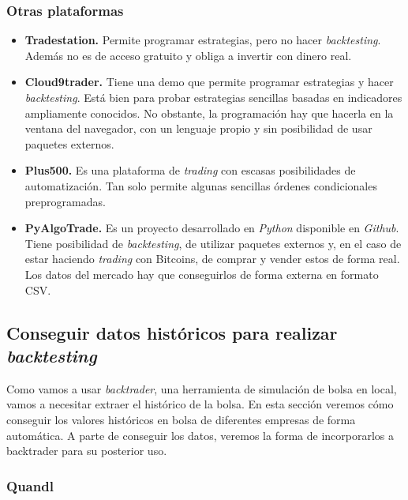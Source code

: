 		
		\subsubsection{Otras plataformas}

		\begin{itemize}
			\item \textbf{Tradestation.} Permite programar estrategias, pero no hacer \textit{backtesting}. Adem\'as no es de acceso gratuito y obliga a invertir con dinero real.
			
			\item \textbf{Cloud9trader.} Tiene una demo que permite programar estrategias y hacer \textit{backtesting}. Est\'a bien para probar estrategias sencillas basadas en indicadores ampliamente conocidos. No obstante, la programaci\'on hay que hacerla en la ventana del navegador, con un lenguaje propio y sin posibilidad de usar paquetes externos.
			
			\item \textbf{Plus500.} Es una plataforma de \textit{trading} con escasas posibilidades de automatizaci\'on. Tan solo permite algunas  sencillas \'ordenes condicionales preprogramadas.
			
			\item \textbf{PyAlgoTrade.} Es un proyecto desarrollado en \textit{Python} disponible en \textit{Github}. Tiene posibilidad de \textit{backtesting}, de utilizar paquetes externos y, en el caso de estar haciendo \textit{trading} con Bitcoins, de comprar y vender estos de forma real. Los datos del mercado hay que conseguirlos de forma externa en formato CSV.
		\end{itemize}
		
	
	\subsection{Conseguir datos hist\'oricos para realizar \textit{backtesting}}\label{sec:get_data}
		
		Como vamos a usar \textit{backtrader}, una herramienta de simulaci\'on de bolsa en local, vamos a necesitar extraer el hist\'orico de la bolsa. En esta secci\'on veremos c\'omo conseguir los valores hist\'oricos en bolsa de diferentes empresas de forma autom\'atica. A parte de conseguir los datos, veremos la forma de incorporarlos a backtrader para su posterior uso.\\
		
		\subsubsection{Quandl}
		
